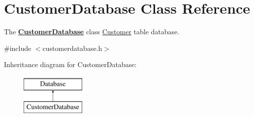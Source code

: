 \hypertarget{classCustomerDatabase}{\section{Customer\-Database Class Reference}
\label{classCustomerDatabase}
}


The {\bfseries \hyperlink{classCustomerDatabase}{Customer\-Database}} class \hyperlink{classCustomer}{Customer} table database.  




{\ttfamily \#include $<$customerdatabase.\-h$>$}

Inheritance diagram for Customer\-Database\-:\begin{figure}[H]
\begin{center}
\leavevmode
\includegraphics[height=2.000000cm]{dc/d7c/classCustomerDatabase}
\end{center}
\end{figure}

